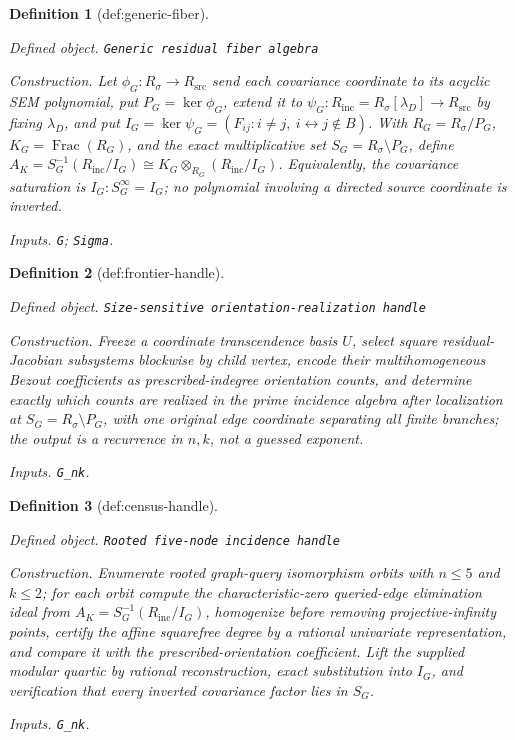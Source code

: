 \documentclass{article}
\newtheorem{definition}{Definition}
\begin{document}
\begin{definition}[def:generic-fiber]\label{def:generic-fiber}
\par\smallskip\noindent\emph{Defined object.} \texttt{Generic residual fiber algebra}
\par\smallskip\noindent\emph{Construction.} Let \(\phi_G:R_{\sigma}\to R_{\mathrm{src}}\) send each covariance coordinate to its acyclic SEM polynomial, put \(P_G=\ker\phi_G\), extend it to \(\psi_G:R_{\mathrm{inc}}=R_{\sigma}[\lambda_D]\to R_{\mathrm{src}}\) by fixing \(\lambda_D\), and put \(I_G=\ker\psi_G=(F_{ij}:i\ne j,\ i\leftrightarrow j\notin B)\). With \(R_G=R_{\sigma}/P_G\), \(K_G=\operatorname{Frac}(R_G)\), and the exact multiplicative set \(S_G=R_{\sigma}\setminus P_G\), define \(A_K=S_G^{-1}(R_{\mathrm{inc}}/I_G)\cong K_G\otimes_{R_G}(R_{\mathrm{inc}}/I_G)\). Equivalently, the covariance saturation is \(I_G:S_G^{\infty}=I_G\); no polynomial involving a directed source coordinate is inverted.
\par\smallskip\noindent\emph{Inputs.} \texttt{G}; \texttt{Sigma}.
\end{definition}

\begin{definition}[def:frontier-handle]\label{def:frontier-handle}
\par\smallskip\noindent\emph{Defined object.} \texttt{Size-\allowbreak{}sensitive orientation-\allowbreak{}realization handle}
\par\smallskip\noindent\emph{Construction.} Freeze a coordinate transcendence basis \(U\), select square residual-Jacobian subsystems blockwise by child vertex, encode their multihomogeneous Bezout coefficients as prescribed-indegree orientation counts, and determine exactly which counts are realized in the prime incidence algebra after localization at \(S_G=R_{\sigma}\setminus P_G\), with one original edge coordinate separating all finite branches; the output is a recurrence in \(n,k\), not a guessed exponent.
\par\smallskip\noindent\emph{Inputs.} \texttt{G\_\allowbreak{}nk}.
\end{definition}

\begin{definition}[def:census-handle]\label{def:census-handle}
\par\smallskip\noindent\emph{Defined object.} \texttt{Rooted five-\allowbreak{}node incidence handle}
\par\smallskip\noindent\emph{Construction.} Enumerate rooted graph-query isomorphism orbits with \(n\le5\) and \(k\le2\); for each orbit compute the characteristic-zero queried-edge elimination ideal from \(A_K=S_G^{-1}(R_{\mathrm{inc}}/I_G)\), homogenize before removing projective-infinity points, certify the affine squarefree degree by a rational univariate representation, and compare it with the prescribed-orientation coefficient. Lift the supplied modular quartic by rational reconstruction, exact substitution into \(I_G\), and verification that every inverted covariance factor lies in \(S_G\).
\par\smallskip\noindent\emph{Inputs.} \texttt{G\_\allowbreak{}nk}.
\end{definition}
\end{document}
